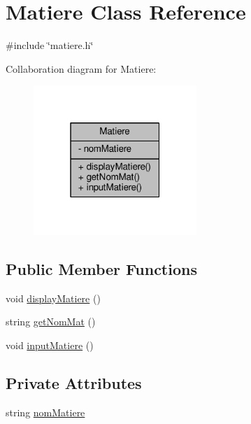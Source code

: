 \hypertarget{classMatiere}{\section{Matiere Class Reference}
\label{classMatiere}
}


{\ttfamily \#include \char`\"{}matiere.\+h\char`\"{}}



Collaboration diagram for Matiere\+:
\nopagebreak
\begin{figure}[H]
\begin{center}
\leavevmode
\includegraphics[width=175pt]{classMatiere__coll__graph}
\end{center}
\end{figure}
\subsection*{Public Member Functions}
\begin{DoxyCompactItemize}
\item 
void \hyperlink{classMatiere_a09ae23268f409d35c58efe724b1a6e08}{display\+Matiere} ()
\item 
string \hyperlink{classMatiere_aa7497ad4ce8943ebc19a34595f169dd2}{get\+Nom\+Mat} ()
\item 
void \hyperlink{classMatiere_ac745942503b322f4b89eb5081aaa10f3}{input\+Matiere} ()
\end{DoxyCompactItemize}
\subsection*{Private Attributes}
\begin{DoxyCompactItemize}
\item 
string \hyperlink{classMatiere_a25d589ef30732b60be865c00ca4d47cd}{nom\+Matiere}
\end{DoxyCompactItemize}


